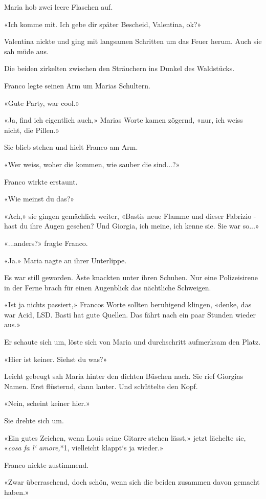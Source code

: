 Maria hob zwei leere Flaschen auf.

«Ich komme mit. Ich gebe dir später Bescheid, Valentina, ok?»

Valentina nickte und ging mit langsamen Schritten um das Feuer herum.
Auch sie sah müde aus.

Die beiden zirkelten zwischen den Sträuchern ins Dunkel des Waldstücks.

Franco legte seinen Arm um Marias Schultern.

«Gute Party, war cool.»

«Ja, find ich eigentlich auch,» Marias Worte kamen zögernd, «nur, ich
weiss nicht, die Pillen.»

Sie blieb stehen und hielt Franco am Arm.

«Wer weiss, woher die kommen, wie sauber die sind...?»

Franco wirkte erstaunt.

«Wie meinst du das?»

«Ach,» sie gingen gemächlich weiter, «Bastis neue Flamme und dieser
Fabrizio - hast du ihre Augen gesehen? Und Giorgia, ich meine, ich kenne
sie. Sie war so...»

«...anders?» fragte Franco.

«Ja.» Maria nagte an ihrer Unterlippe.

Es war still geworden. Äste knackten unter ihren Schuhen. Nur eine
Polizeisirene in der Ferne brach für einen Augenblick das nächtliche
Schweigen.

«Ist ja nichts passiert,» Francos Worte sollten beruhigend klingen,
«denke, das war Acid, LSD. Basti hat gute Quellen. Das fährt nach ein
paar Stunden wieder aus.»

Er schaute sich um, löste sich von Maria und durchschritt aufmerksam den
Platz.

«Hier ist keiner. Siehst du was?»

Leicht gebeugt sah Maria hinter den dichten Büschen nach. Sie rief
Giorgias Namen. Erst flüsternd, dann lauter. Und schüttelte den Kopf.

«Nein, scheint keiner hier.»

Sie drehte sich um.

«Ein gutes Zeichen, wenn Louis seine Gitarre stehen lässt,» jetzt
lächelte sie, «\emph{cosa fa l` amore,}*1, vielleicht klappt`s ja
wieder.»

Franco nickte zustimmend.

«Zwar überraschend, doch schön, wenn sich die beiden zusammen davon
gemacht haben.»

